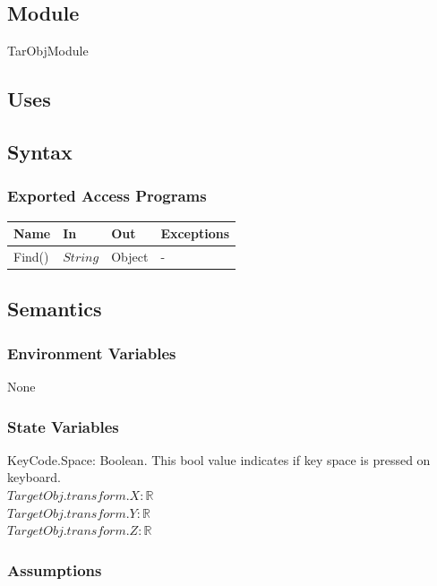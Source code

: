 \documentclass[12pt, titlepage]{article}
\begin{document}
\subsection{Module}

TarObjModule

\subsection{Uses}

\subsection{Syntax}

\subsubsection{Exported Access Programs}

\begin{center}
	\begin{tabular}{p{2cm} p{4cm} p{4cm} p{2cm}}
		\hline
		\textbf{Name} & \textbf{In} & \textbf{Out} & \textbf{Exceptions} \\
		\hline
		Find() & $String$ & Object & - \\
		\hline		
	\end{tabular}
\end{center}

\subsection{Semantics}

\subsubsection{Environment Variables}
None
\subsubsection{State Variables}

KeyCode.Space: Boolean.
This bool value indicates if key space is pressed on keyboard.\\
$TargetObj.transform.X: \mathbb{R}$\\
$TargetObj.transform.Y: \mathbb{R}$\\
$TargetObj.transform.Z: \mathbb{R}$

\subsubsection{Assumptions}
\end{document}
